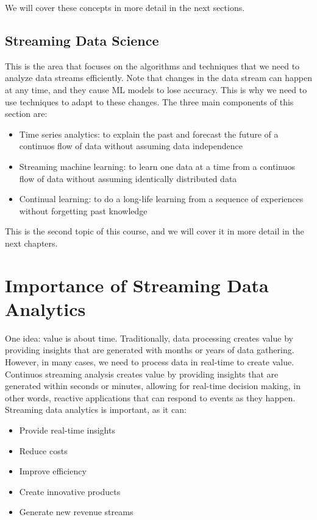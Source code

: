 We will cover these concepts in more detail in the next sections.

\subsection{Streaming Data Science}

This is the area that focuses on the algorithms and techniques that we need to analyze data streams efficiently.
Note that changes in the data stream can happen at any time, and they cause ML models to lose accuracy. This is
why we need to use techniques to adapt to these changes. The three main components of this section are:

\begin{itemize}
    \item Time series analytics: to explain the past and forecast the future of a continuos
    flow of data without assuming data independence
    \item Streaming machine learning: to learn one data at a time from a continuos flow of data without
    assuming identically distributed data
    \item Continual learning: to do a long-life learning from a sequence of experiences without 
    forgetting past knowledge
\end{itemize}

This is the second topic of this course, and we will cover it in more detail in the next chapters.

\section{Importance of Streaming Data Analytics}

One idea: value is about time. Traditionally, data processing creates value by providing insights that
are generated with months or years of data gathering. However, in many cases, we need to process data in real-time
to create value. \\

Continuos streaming analysis creates value by providing insights that are generated within seconds
or minutes, allowing for real-time decision making, in other words, reactive applications that can respond to
events as they happen.\\

Streaming data analytics is important, as it can:

\begin{itemize}
    \item Provide real-time insights
    \item Reduce costs
    \item Improve efficiency
    \item Create innovative products
    \item Generate new revenue streams
\end{itemize}

